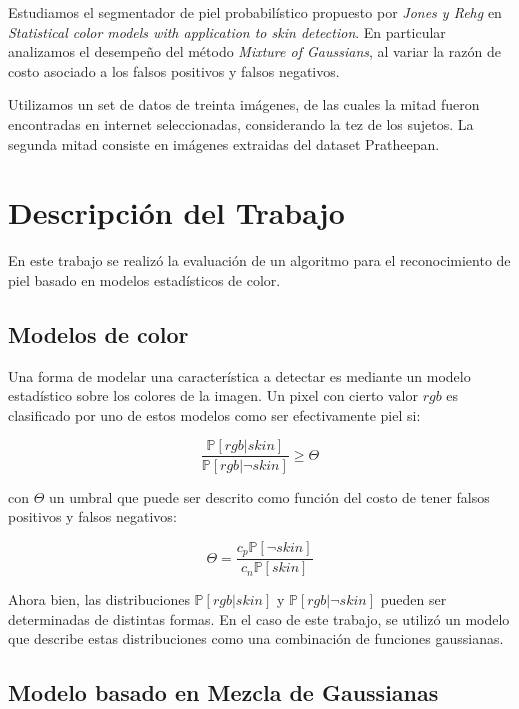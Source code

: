 \documentclass[12pt]{article}
\begin{document}
Estudiamos el segmentador de piel probabilístico propuesto por \emph{Jones y Rehg} en \emph{Statistical color models with application to skin detection}. En particular analizamos el desempeño del método \emph{Mixture of Gaussians}, al variar la razón de costo asociado a los falsos positivos y falsos negativos.

Utilizamos un set de datos de treinta imágenes, de las cuales la mitad fueron encontradas en internet seleccionadas, considerando la tez de los sujetos. La segunda mitad consiste en imágenes extraidas del dataset Pratheepan.



\section{Descripción del Trabajo}

En este trabajo se realizó la evaluación de un algoritmo para el reconocimiento
de piel basado en modelos estadísticos de color. 

\subsection{Modelos de color}

Una forma de modelar una característica a detectar es mediante un modelo
estadístico sobre los colores de la imagen. Un pixel con cierto valor $rgb$ es
clasificado por uno de estos modelos como ser efectivamente piel si:

\begin{equation}
    \frac{ \mathbb{P} [ rgb|skin ] }{ \mathbb{P} [ rgb | \neg skin ] } \geq
    \Theta
\end{equation}

con $\Theta$ un umbral que puede ser descrito como función del costo de tener
falsos positivos y falsos negativos:

\begin{equation}
    \Theta = \frac{c_p \mathbb{P} [\neg skin]}{c_n \mathbb{P}[skin]}
\end{equation}

Ahora bien, las distribuciones $\mathbb{P} [ rgb|skin ]$ y $\mathbb{P} [ rgb | \neg
skin ]$ pueden ser determinadas de distintas formas. En el caso de este trabajo, se
utilizó un modelo que describe estas distribuciones como una combinación de
funciones gaussianas.

\subsection{Modelo basado en Mezcla de Gaussianas}
\end{document}
